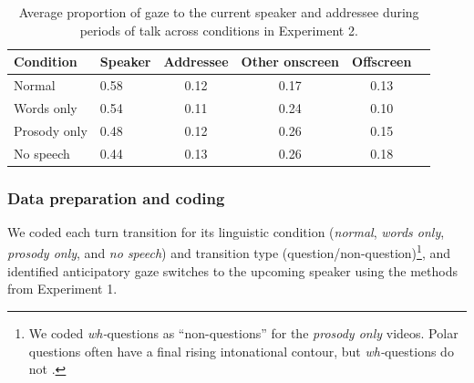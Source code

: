 \documentclass[authoryear, 12pt]{elsarticle}
\begin{document}
\linespread{1}
\begin{table}
\begin{center}
  \begin{tabular}{llcccc}
    \hline
    Condition & Speaker & Addressee & Other onscreen & Offscreen\\
    \hline
    Normal 			& 0.58 & 0.12 & 0.17 & 0.13 \\
    Words only 		& 0.54 & 0.11 & 0.24 & 0.10 \\
    Prosody only 	& 0.48 & 0.12 & 0.26 & 0.15 \\
    No speech 		& 0.44 & 0.13 & 0.26 & 0.18 \\
    \hline
  \end{tabular}
\end{center}
  \caption{Average proportion of gaze to the current speaker and addressee during periods of talk across conditions in Experiment 2.}
\label{tab:look_e2b}
\end{table}


\subsubsection*{Data preparation and coding}
We coded each turn transition for its linguistic condition (\textit{normal}, \textit{words only}, \textit{prosody only}, and \textit{no speech}) and transition type (question/non-question)\footnote{We coded \textit{wh-}questions as ``non-questions'' for the \textit{prosody only} videos. Polar questions often have a final rising intonational contour, but \textit{wh-}questions do not  \citep{hedberg2010}.}, and identified anticipatory gaze switches to the upcoming speaker using the methods from Experiment 1.
\end{document}
